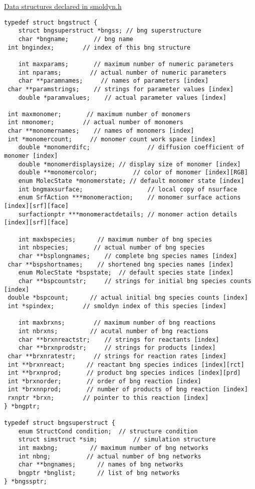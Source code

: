 \documentclass {scrbook}
\begin{document}
\underline{Data structures declared in smoldyn.h}

\begin{lstlisting}
typedef struct bngstruct {
	struct bngsuperstruct *bngss; // bng superstructure
	char *bngname;       // bng name
 int bngindex;        // index of this bng structure
 
	int maxparams;       // maximum number of numeric parameters
	int nparams;        // actual number of numeric parameters
	char **paramnames;     // names of parameters [index]
 char **paramstrings;    // strings for parameter values [index]
	double *paramvalues;    // actual parameter values [index]
 
 int maxmonomer;       // maximum number of monomers
 int nmonomer;        // actual number of monomers
 char **monomernames;    // names of monomers [index]
 int *monomercount;     // monomer count work space [index]
	double *monomerdifc;				// diffusion coefficient of monomer [index]
	double *monomerdisplaysize;	// display size of monomer [index]
	double **monomercolor;			// color of monomer [index][RGB]
	enum MolecState *monomerstate; // default monomer state [index]
	int bngmaxsurface;					// local copy of nsurface
	enum SrfAction ***monomeraction;	// monomer surface actions [index][srf][face]
	surfactionptr ***monomeractdetails;	// monomer action details [index][srf][face]

	int maxbspecies;      // maximum number of bng species
	int nbspecies;       // actual number of bng species
	char **bsplongnames;    // complete bng species names [index]
 char **bspshortnames;    // shortened bng species names [index]
	enum MolecState *bspstate;	// default species state [index]
	char **bspcountstr;     // strings for initial bng species counts [index]
 double *bspcount;      // actual initial bng species counts [index]
 int *spindex;        // smoldyn index of this species [index]

	int maxbrxns;        // maximum number of bng reactions
	int nbrxns;         // acutal number of bng reactions
	char **brxnreactstr;    // strings for reactants [index]
	char **brxnprodstr;     // strings for products [index]
 char **brxnratestr;     // strings for reaction rates [index]
 int **brxnreact;      // reactant bng species indices [index][rct]
 int **brxnprod;       // product bng species indices [index][prd]
 int *brxnorder;       // order of bng reaction [index]
 int *brxnnprod;       // number of products of bng reaction [index]
 rxnptr *brxn;        // pointer to this reaction [index]
} *bngptr;

typedef struct bngsuperstruct {
	enum StructCond condition;	// structure condition
	struct simstruct *sim;			// simulation structure
	int maxbng;         // maximum number of bng networks
	int nbng;          // actual number of bng networks
	char **bngnames;      // names of bng networks
	bngptr *bnglist;      // list of bng networks
} *bngssptr;
\end{lstlisting}
\end{document}
